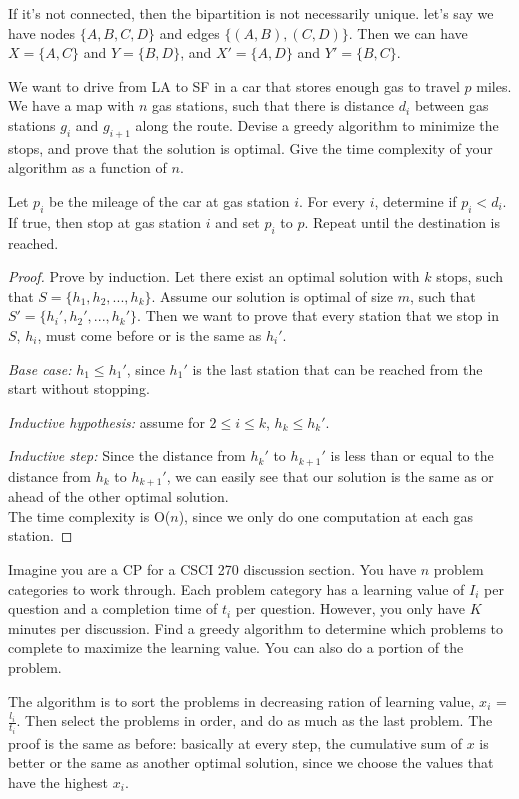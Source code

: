 \documentclass[11pt]{article}
\begin{document}
If it's not connected, then the bipartition is not necessarily unique. let's say we have nodes $\{A,B,C,D\}$ and edges $\{(A,B), (C,D)\}$. Then we can have $X = \{A,C\}$ and $Y = \{B,D\}$, and $X' = \{A, D\}$ and $Y' = \{B,C\}$.

\begin{exmp}
We want to drive from LA to SF in a car that stores enough gas to travel $p$ miles. We have a map with $n$ gas stations, such that there is distance $d_i$ between gas stations $g_i$ and $g_{i+1}$ along the route. Devise a greedy algorithm to minimize the stops, and prove that the solution is optimal. Give the time complexity of your algorithm as a function of $n$.
\end{exmp}

Let $p_i$ be the mileage of the car at gas station $i$. For every $i$, determine if $p_i < d_i$. If true, then stop at gas station $i$ and set $p_i$ to $p$. Repeat until the destination is reached.

\begin{proof}
\setlength{\parindent}{12pt}
Prove by induction. Let there exist an optimal solution with $k$ stops, such that $S = \{h_1, h_2, ..., h_k\}$. Assume our solution is optimal of size $m$, such that $S' = \{h_i', h_2', ..., h_k'\}$. Then we want to prove that every station that we stop in $S$, $h_i$, must come before or is the same as $h_i'$. \par
\textit{Base case:} $h_1 \leq h_1'$, since $h_1'$ is the last station that can be reached from the start without stopping.\par
\textit{Inductive hypothesis:} assume for $2 \leq i \leq k$, $h_k \leq h_k'$.\par
\textit{Inductive step:} Since the distance from $h_k'$ to $h_{k+1}'$ is less than or equal to the distance from $h_k$ to $h_{k+1}'$, we can easily see that our solution is the same as or ahead of the other optimal solution. \\[1em]
The time complexity is O($n$), since we only do one computation at each gas station.
\end{proof}

\begin{exmp}
Imagine you are a CP for a CSCI 270 discussion section. You have $n$ problem categories to work through. Each problem category has a learning value of $I_i$ per question and a completion time of $t_i$ per question. However, you only have $K$ minutes per discussion. Find a greedy algorithm to determine which problems to complete to maximize the learning value. You can also do a portion of the problem.
\end{exmp}
The algorithm is to sort the problems in decreasing ration of learning value, $x_i$ = $\frac{l_i}{t_i}$. Then select the problems in order, and do as much as the last problem. The proof is the same as before: basically at every step, the cumulative sum of $x$ is better or the same as another optimal solution, since we choose the values that have the highest $x_i$.
\end{document}
